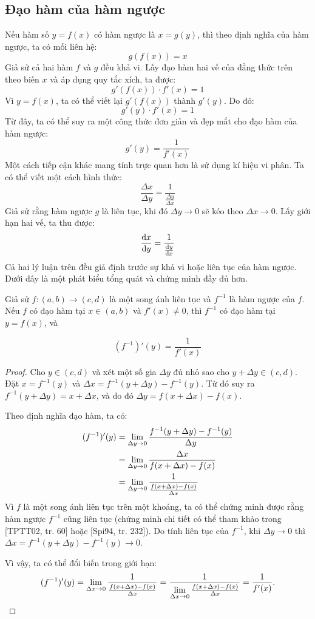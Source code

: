 \subsection{Đạo hàm của hàm ngược}

Nếu hàm số $y=f(x)$ có hàm ngược là $x = g(y)$, thì theo định nghĩa của hàm ngược, ta có mối liên hệ:
$$
g(f(x)) = x
$$
Giả sử cả hai hàm $f$ và $g$ đều khả vi. Lấy đạo hàm hai vế của đẳng thức trên theo biến $x$ và áp dụng quy tắc xích, ta được:
$$
g'(f(x)) \cdot f'(x) = 1
$$
Vì $y = f(x)$, ta có thể viết lại $g'(f(x))$ thành $g'(y)$. Do đó:
$$
g'(y) \cdot f'(x) = 1
$$
Từ đây, ta có thể suy ra một công thức đơn giản và đẹp mắt cho đạo hàm của hàm ngược:
$$
g'(y) = \dfrac{1}{f'(x)}
$$
Một cách tiếp cận khác mang tính trực quan hơn là sử dụng kí hiệu vi phân. Ta có thể viết một cách hình thức:
$$
\dfrac{\Delta x}{\Delta y} = \dfrac{1}{\frac{\Delta y}{\Delta x}}
$$
Giả sử rằng hàm ngược $g$ là liên tục, khi đó $\Delta y \to 0$ sẽ kéo theo $\Delta x \to 0$. Lấy giới hạn hai vế, ta thu được:
$$
\frac{\mathrm{d}x}{\mathrm{d}y} = \dfrac{1}{\frac{\mathrm{d}y}{\mathrm{d}x}}
$$
Cả hai lý luận trên đều giả định trước sự khả vi hoặc liên tục của hàm ngược. Dưới đây là một phát biểu tổng quát và chứng minh đầy đủ hơn.

\begin{theorem}
Giả sử $f: (a, b) \to (c, d)$ là một song ánh liên tục và $f^{-1}$ là hàm ngược của $f$. Nếu $f$ có đạo hàm tại $x \in (a, b)$ và $f'(x) \ne 0$, thì $f^{-1}$ có đạo hàm tại $y = f(x)$, và
\begin{tcolorbox}[colback=yellow!10!white, colframe=blue!75!black, boxrule=0.5pt, arc=2mm]
$$
(f^{-1})'(y) = \dfrac{1}{f'(x)}
$$
\end{tcolorbox}
\end{theorem}
\begin{proof}
Cho $y \in (c, d)$ và xét một số gia $\Delta y$ đủ nhỏ sao cho $y + \Delta y \in (c, d)$. Đặt $x = f^{-1}(y)$ và $\Delta x = f^{-1}(y + \Delta y) - f^{-1}(y)$.
Từ đó suy ra $f^{-1}(y + \Delta y) = x + \Delta x$, và do đó $\Delta y = f(x + \Delta x) - f(x)$.

Theo định nghĩa đạo hàm, ta có:
\begin{align*}
(f^{-1})'(y) &= \lim\limits_{\Delta y \to 0} \dfrac{f^{-1}(y + \Delta y) - f^{-1}(y)}{\Delta y} \\
&= \lim\limits_{\Delta y \to 0} \dfrac{\Delta x}{f(x + \Delta x) - f(x)} \\
&= \lim\limits_{\Delta y \to 0} \dfrac{1}{\frac{f(x + \Delta x) - f(x)}{\Delta x}}
\end{align*}
Vì $f$ là một song ánh liên tục trên một khoảng, ta có thể chứng minh được rằng hàm ngược $f^{-1}$ cũng liên tục (chứng minh chi tiết có thể tham khảo trong [TPTT02, tr. 60] hoặc [Spi94, tr. 232]). Do tính liên tục của $f^{-1}$, khi $\Delta y \to 0$ thì $\Delta x = f^{-1}(y + \Delta y) - f^{-1}(y) \to 0$.

Vì vậy, ta có thể đổi biến trong giới hạn:
$$
(f^{-1})'(y) = \lim\limits_{\Delta x \to 0} \dfrac{1}{\frac{f(x + \Delta x) - f(x)}{\Delta x}} = \dfrac{1}{\lim\limits_{\Delta x \to 0} \frac{f(x + \Delta x) - f(x)}{\Delta x}} = \dfrac{1}{f'(x)}.
$$
\end{proof}

